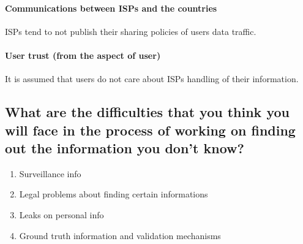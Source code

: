\paragraph{Communications between ISPs and the countries}
ISPs tend to not publish their sharing policies of users data traffic.

\paragraph{User trust (from the aspect of user)}
It is assumed that users do not care about ISPs handling of their information.

\subsection{What are the difficulties that you think you will face in the 
process of working on finding out the information you don't know?}

\begin{enumerate}
\item Surveillance info
\item Legal problems about finding certain informations
\item Leaks on personal info
\item Ground truth information and validation mechanisms
\end{enumerate}
